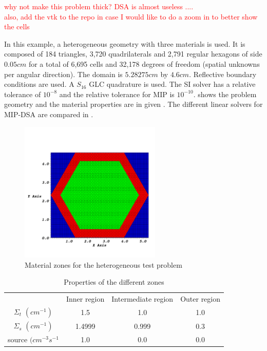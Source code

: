 \textcolor{red}{why not make this problem thick? DSA is almost useless ....\\}
\textcolor{red}{also, add the vtk to the repo in case I would like to do a zoom in to better show the cells}

In this example, a heterogeneous geometry with three materials is used. It is 
composed of 184 triangles, 3,720 quadrilaterals and 2,791 regular hexagons of 
side $0.05cm$ for a total of 6,695 cells and 32,178 degrees of freedom (spatial 
unknowns per angular direction). The domain is $5.28275cm$ by $4.6cm$. 
Reflective boundary conditions are used. A $S_{16}$ GLC 
quadrature is used. The SI solver has a relative tolerance of 
$10^{-8}$ and the relative tolerance for MIP is $10^{-10}$. 
shows the problem geometry and the material properties are in given
.
The different linear solvers for MIP-DSA are compared in .
%
\begin{figure}[!htbp]
  \centering
  \includegraphics[width=0.6\textwidth]{source_crop}
  \caption{Material zones for the heterogeneous test problem}
  \label{hex_zones}
\end{figure}
%
\begin{table}[!htbp]
  \begin{center}
    \caption{Properties of the different zones}
    \begin{tabular}{|c|c|c|c|}
      \hline
       & Inner region & Intermediate region & Outer region \\
      $\Sigma_t$ $(cm^{-1})$ & 1.5 & 1.0 & 1.0 \\
      $\Sigma_s$ $(cm^{-1})$ & 1.4999 & 0.999 & 0.3 \\
     source $(cm^{-3}s^{-1}$ & 1.0 & 0.0 & 0.0 \\
      \hline
    \end{tabular}
    \label{hex_prop}
  \end{center}
\end{table}
